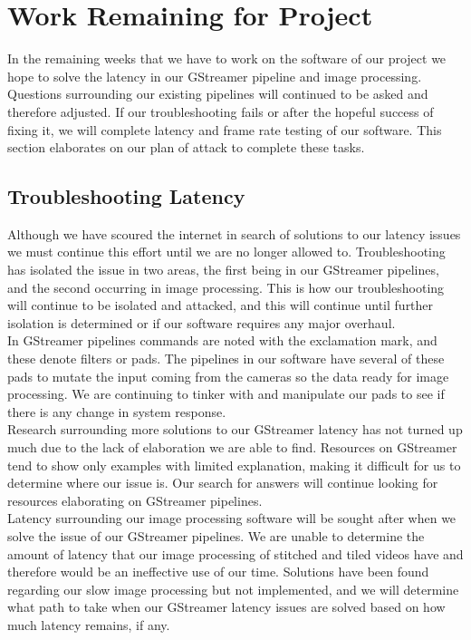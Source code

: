 \documentclass[letterpaper,10pt,serif,draftclsnofoot,onecolumn,compsoc,titlepage]{IEEEtran}
\begin{document}
\section{Work Remaining for Project}

In the remaining weeks that we have to work on the software of our project we hope to 
solve the latency in our GStreamer pipeline and image processing. Questions surrounding 
our existing pipelines will continued to be asked and therefore adjusted. If our 
troubleshooting fails or after the hopeful success of fixing it, we will complete latency 
and frame rate testing of our software. This section elaborates on our plan of attack to 
complete these tasks.\\

\subsection{Troubleshooting Latency}

Although we have scoured the internet in search of solutions to our latency issues we must 
continue this effort until we are no longer allowed to. Troubleshooting has isolated the 
issue in two areas, the first being in our GStreamer pipelines, and the second occurring 
in image processing. This is how our troubleshooting will continue to be isolated and 
attacked, and this will continue until further isolation is determined or if our 
software requires any major overhaul. \\

In GStreamer pipelines commands are noted with the exclamation mark, and these denote 
filters or pads. The pipelines in our software have several of these pads to mutate 
the input coming from the cameras so the data ready for image processing. We are 
continuing to tinker with and manipulate our pads to see if there is any change in 
system response. \\

Research surrounding more solutions to our GStreamer latency has not turned up much 
due to the lack of elaboration we are able to find. Resources on GStreamer tend to show 
only examples with limited explanation, making it difficult for us to determine where 
our issue is. Our search for answers will continue looking for resources elaborating on 
GStreamer pipelines. \\

Latency surrounding our image processing software will be sought after when we solve the 
issue of our GStreamer pipelines. We are unable to determine the amount of latency that 
our image processing of stitched and tiled videos have and therefore would be an 
ineffective 
use of our time. Solutions have been found regarding our slow image processing but not 
implemented, and we will determine what path to take when our GStreamer latency issues 
are solved based on how much latency remains, if any. \\
\end{document}
